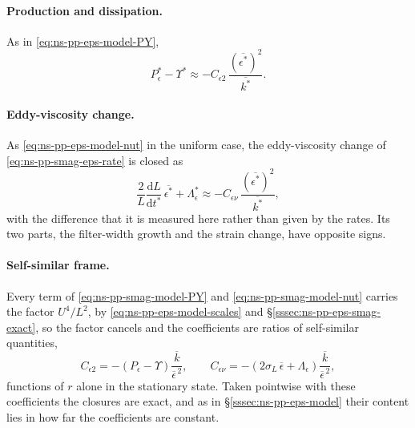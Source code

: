 \documentclass{article}
\begin{document}
\paragraph{Production and dissipation.}
As in \eqref{eq:ns-pp-eps-model-PY},
\begin{equation}\label{eq:ns-pp-smag-model-PY}
  P_\epsilon^* - \Upsilon^*
  \approx -C_{\epsilon 2}\, \frac{\left(\overline{\epsilon^*}\right)^2}{\overline{k^*}} .
\end{equation}

\paragraph{Eddy-viscosity change.}
As \eqref{eq:ns-pp-eps-model-nut} in the uniform case, the eddy-viscosity
change of \eqref{eq:ns-pp-smag-eps-rate} is closed as
\begin{equation}\label{eq:ns-pp-smag-model-nut}
  \frac{2}{L}\frac{\mathrm{d} L}{\mathrm{d} t^*}\, \overline{\epsilon^*} + \Lambda_\epsilon^*
  \approx -C_{\epsilon\nu}\, \frac{\left(\overline{\epsilon^*}\right)^2}{\overline{k^*}} ,
\end{equation}
with the difference that it is measured here rather than given by the rates.
Its two parts, the filter-width growth and the strain change, have opposite
signs.

\paragraph{Self-similar frame.}
Every term of \eqref{eq:ns-pp-smag-model-PY} and
\eqref{eq:ns-pp-smag-model-nut} carries the factor $U^4/L^2$, by
\eqref{eq:ns-pp-eps-model-scales} and \S\ref{sssec:ns-pp-eps-smag-exact}, so
the factor cancels and the coefficients are ratios of self-similar
quantities,
\begin{equation}\label{eq:ns-pp-smag-coeffs}
  C_{\epsilon 2} = -\left( P_\epsilon - \Upsilon \right) \frac{\overline{k}}{\overline{\epsilon}^{\,2}} ,
  \qquad
  C_{\epsilon\nu} = -\left( 2\sigma_L\, \overline{\epsilon} + \Lambda_\epsilon \right) \frac{\overline{k}}{\overline{\epsilon}^{\,2}} ,
\end{equation}
functions of $r$ alone in the stationary state. Taken pointwise with these
coefficients the closures are exact, and as in
\S\ref{sssec:ns-pp-eps-model} their content lies in how far the coefficients
are constant.
\end{document}
